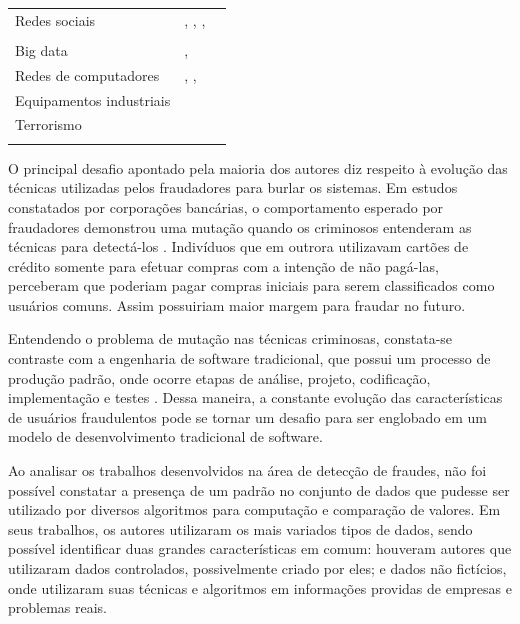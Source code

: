 \documentclass[smallextended]{svjour3}
\begin{document}
\begin{table}
\begin{tabular}[!Ht]{lll}
		Redes sociais & \cite{Yu2016}, \cite{Liu2015}, \cite{Feily2009},  &  \\
		& \cite{Rebahi2011} &  \\
		
		Big data & \cite{Sharma2015}, \cite{Mahmood2013} &  \\
		
		Redes de computadores & \cite{Allan2010}, \cite{Branco2016}, \cite{Akoglu2015}  &  \\
		
		Equipamentos industriais & \cite{Bauder2016} &  \\
		
		Terrorismo & \cite{Allan2010} &  \\
		\noalign{\smallskip}\hline
	\end{tabular}
\end{table}

O principal desafio apontado pela maioria dos autores diz respeito à evolução das técnicas utilizadas pelos fraudadores para burlar os sistemas. Em estudos constatados por corporações bancárias, o comportamento esperado por fraudadores demonstrou uma mutação quando os criminosos entenderam as técnicas para detectá-los \citep{Bolton2002}. Indivíduos que em outrora utilizavam cartões de crédito somente para efetuar compras com a intenção de não pagá-las, perceberam que poderiam pagar compras iniciais para serem classificados como usuários comuns. Assim possuiriam maior margem para fraudar no futuro.

Entendendo o problema de mutação nas técnicas criminosas, constata-se contraste com a engenharia de software tradicional, que possui um processo de produção padrão, onde ocorre etapas de análise, projeto, codificação, implementação e testes \citep{sommervillesoftware}. Dessa maneira, a constante evolução das características de usuários fraudulentos pode se tornar um desafio para ser englobado em um modelo de desenvolvimento tradicional de software. 

Ao analisar os trabalhos desenvolvidos na área de detecção de fraudes, não foi possível constatar a presença de um padrão no conjunto de dados que pudesse ser utilizado por diversos algoritmos para computação e comparação de valores. Em seus trabalhos, os autores utilizaram os mais variados tipos de dados, sendo possível identificar duas grandes características em comum: houveram autores que utilizaram dados controlados, possivelmente criado por eles; e dados não fictícios, onde utilizaram suas técnicas e algoritmos em informações providas de empresas e problemas reais. 
\end{document}
